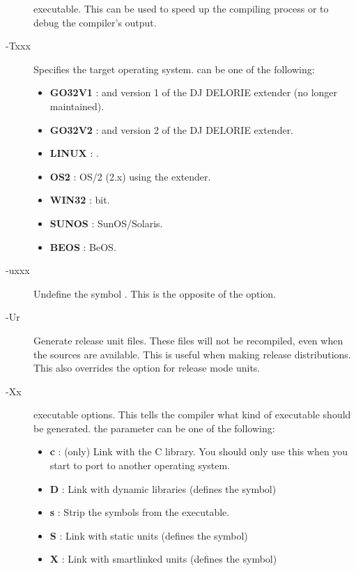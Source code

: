 \begin{description}
executable. This can be used to speed up the compiling process or to debug
the compiler's output.
\item[-Txxx]  Specifies the target operating system.  can be one of
the following:
\begin{itemize}
\item \textbf{GO32V1} : \dos and version 1 of the DJ DELORIE extender (no longer maintained).
\item \textbf{GO32V2} : \dos and version 2 of the DJ DELORIE extender.
\item \textbf{LINUX} : \linux.
\item \textbf{OS2} : OS/2 (2.x) using the  extender.
\item \textbf{WIN32} :  bit.
\item \textbf{SUNOS} : SunOS/Solaris.
\item \textbf{BEOS} : BeOS.
\end{itemize}
\item [-uxxx]  Undefine the symbol . This is the opposite
of the  option.
\item [-Ur]  Generate release unit files. These files will not be
recompiled, even when the sources are available. This is useful when making
release distributions. This also overrides the  option for release 
mode units.
\item [-Xx]  executable options. This tells the compiler what
kind of executable should be generated. the parameter 
can be one of the following:
\begin{itemize}
\item \textbf{c} : (\linux only) Link with the C library. You should only use this when
  you start to port \fpc to another operating system. 
\item \textbf{D} : Link with dynamic libraries (defines the
 symbol) 
\item \textbf{s} : Strip the symbols from the executable. 
\item \textbf{S} : Link with static units (defines the  symbol)
\item \textbf{X} : Link with smartlinked units (defines the
 symbol) 
\end{itemize}
\end{description}

%
%

